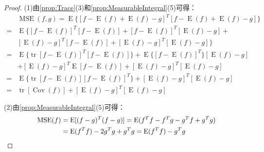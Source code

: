 \begin{proof}
	(1)由\cref{prop:Trace}(3)和\cref{prop:MeasurableIntegral}(5)可得：
	\begin{align*}
		&\operatorname{MSE}(f,g)=\operatorname{E}\{[f-\operatorname{E}(f)+\operatorname{E}(f)-g]^T[f-\operatorname{E}(f)+\operatorname{E}(f)-g]\} \\
		=&\operatorname{E}\{[f-\operatorname{E}(f)]^T[f-\operatorname{E}(f)]+[f-\operatorname{E}(f)]^T[\operatorname{E}(f)-g]+ \\
		&[\operatorname{E}(f)-g]^T[f-\operatorname{E}(f)]+[\operatorname{E}(f)-g]^T[\operatorname{E}(f)-g]\} \\
		=&\operatorname{E}\{\operatorname{tr}[f-\operatorname{E}(f)]^T[f-\operatorname{E}(f)]\}+\operatorname{E}\{[f-\operatorname{E}(f)]^T\}[\operatorname{E}(f)-g] \\
		&+[\operatorname{E}(f)-g]^T\operatorname{E}[f-\operatorname{E}(f)]+[\operatorname{E}(f)-g]^T[\operatorname{E}(f)-g] \\
		=&\operatorname{E}\{\operatorname{tr}[f-\operatorname{E}(f)][f-\operatorname{E}(f)]^T\}+[\operatorname{E}(f)-g]^T[\operatorname{E}(f)-g] \\
		=&\operatorname{tr}[\operatorname{Cov}(f)]+[\operatorname{E}(f)-g]^T[\operatorname{E}(f)-g]
	\end{align*}\par
	(2)由\cref{prop:MeasurableIntegral}(5)可得：
	\begin{align*}
		\operatorname{MSE}(f)&=\operatorname{E}[(f-g)^T(f-g)]=\operatorname{E}(f^Tf-f^Tg-g^Tf+g^Tg) \\
		&=\operatorname{E}(f^Tf)-2g^Tg+g^Tg=\operatorname{E}(f^Tf)-g^Tg\qedhere
	\end{align*}
\end{proof}

